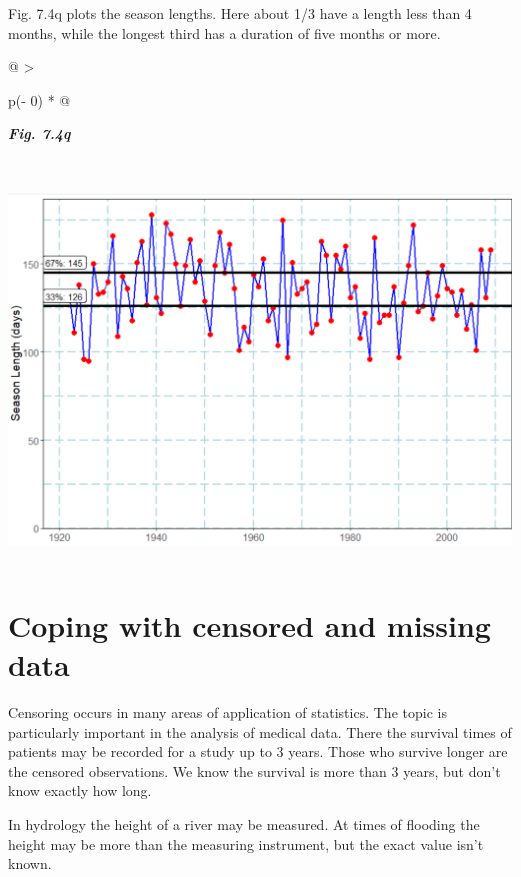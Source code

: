 \documentclass[
  letterpaper,
  DIV=11,
  numbers=noendperiod]{scrreprt}
\begin{document}
Fig. 7.4q plots the season lengths. Here about 1/3 have a length less
than 4 months, while the longest third has a duration of five months or
more.

\begin{longtable}[]{@{}
  >{\raggedright\arraybackslash}p{(\columnwidth - 0\tabcolsep) * }@{}}
\toprule\noalign{}
\begin{minipage}[b]{\linewidth}\raggedright
\textbf{\emph{Fig. 7.4q}}
\end{minipage} \\
\midrule\noalign{}
\endhead
\bottomrule\noalign{}
\endlastfoot
\includegraphics[width=5.7214in,height=4.00612in]{figures/Fig7.4q.png} \\
\end{longtable}

\section{Coping with censored and missing
data}\label{coping-with-censored-and-missing-data}

Censoring occurs in many areas of application of statistics. The topic
is particularly important in the analysis of medical data. There the
survival times of patients may be recorded for a study up to 3 years.
Those who survive longer are the censored observations. We know the
survival is more than 3 years, but don't know exactly how long.

In hydrology the height of a river may be measured. At times of flooding
the height may be more than the measuring instrument, but the exact
value isn't known.
\end{document}

